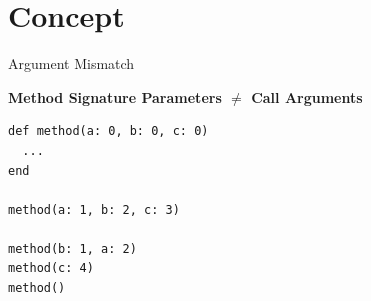 \documentclass[xcolor=dvipsname]{beamer} %
\begin{document}
\section{Concept}
\begin{frame}[fragile]{Argument Mismatch}
\begin{table}
	\centering
	\textbf{Method Signature Parameters $\not=$ Call Arguments}
\end{table}

\begin{table}
\begin{minipage}{0.8\textwidth}
\begin{lstlisting}
def method(a: 0, b: 0, c: 0)
  ...
end

method(a: 1, b: 2, c: 3)

method(b: 1, a: 2)
method(c: 4)
method()
\end{lstlisting}
\end{minipage} %
\begin{minipage}{0.45\textwidth}
\end{minipage}
\end{table}
\end{frame}
\end{document}
